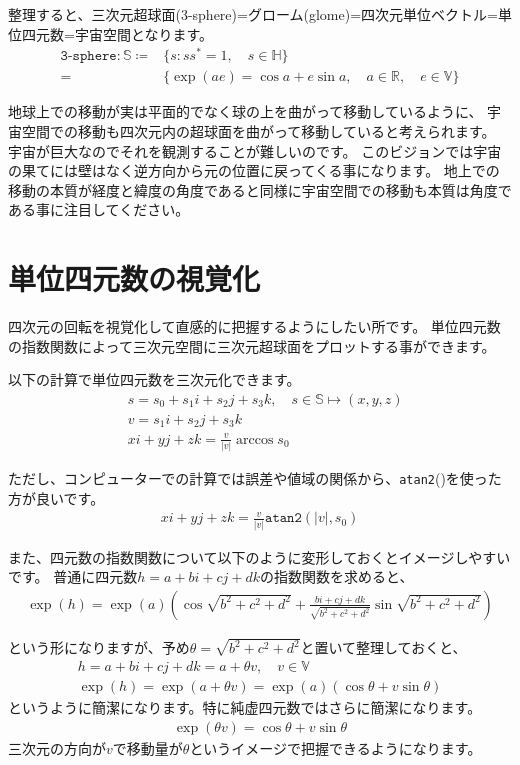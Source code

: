 \documentclass[a4paper,12pt,notitlepage]{jsreport}
\begin{document}
整理すると、三次元超球面(3-sphere)=グローム(glome)=四次元単位ベクトル=単位四元数=宇宙空間となります。
\begin{equation}
  \begin{split}
    \texttt{3-sphere}:\mathbb{S}\coloneq&\{s:ss^*=1,\quad s\in\mathbb{H}\}\\
    =~&\{\exp(ae)=\cos a+e\sin a,\quad a\in\mathbb{R},\quad e\in\mathbb{V}\}
  \end{split}
\end{equation}

地球上での移動が実は平面的でなく球の上を曲がって移動しているように、
宇宙空間での移動も四次元内の超球面を曲がって移動していると考えられます。
宇宙が巨大なのでそれを観測することが難しいのです。
このビジョンでは宇宙の果てには壁はなく逆方向から元の位置に戻ってくる事になります。
地上での移動の本質が経度と緯度の角度であると同様に宇宙空間での移動も本質は角度である事に注目してください。

\section{単位四元数の視覚化}

四次元の回転を視覚化して直感的に把握するようにしたい所です。
単位四元数の指数関数によって三次元空間に三次元超球面をプロットする事ができます。

以下の計算で単位四元数を三次元化できます。
\begin{equation}
  \begin{split}
    &s=s_0+s_1i+s_2j+s_3k,\quad s\in\mathbb{S}\mapsto (x,y,z)\\
    &v=s_1i+s_2j+s_3k\\
    &xi+yj+zk=\frac{v}{|v|}\arccos s_0
  \end{split}
\end{equation}

ただし、コンピューターでの計算では誤差や値域の関係から、\texttt{atan2}()を使った方が良いです。
\begin{gather}
  xi+yj+zk=\frac{v}{|v|}\texttt{atan2}(|v|, s_0)
\end{gather}

また、四元数の指数関数について以下のように変形しておくとイメージしやすいです。
普通に四元数$h=a+bi+cj+dk$の指数関数を求めると、
\begin{gather}
  \exp(h)=\exp(a)\left(\cos\sqrt{b^2+c^2+d^2}+\frac{bi+cj+dk}{\sqrt{b^2+c^2+d^2}}\sin\sqrt{b^2+c^2+d^2}\right)
\end{gather}

という形になりますが、予め$\theta=\sqrt{b^2+c^2+d^2}$と置いて整理しておくと、
\begin{gather}
  h=a+bi+cj+dk=a+\theta v,\quad v\in\mathbb{V}\\
  \exp(h)=\exp(a+\theta v)=\exp(a)(\cos \theta+v\sin\theta)
\end{gather}
というように簡潔になります。特に純虚四元数ではさらに簡潔になります。
\begin{gather}
  \exp(\theta v)=\cos \theta+v\sin\theta
\end{gather}
三次元の方向が$v$で移動量が$\theta$というイメージで把握できるようになります。
\end{document}
